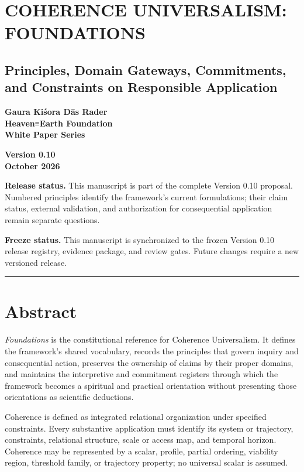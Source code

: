 \documentclass[
  11pt,
]{article}
\author{}
\date{}
\begin{document}
\section{COHERENCE UNIVERSALISM:
FOUNDATIONS}\label{coherence-universalism-foundations}

\subsection{Principles, Domain Gateways, Commitments, and Constraints on
Responsible
Application}\label{principles-domain-gateways-commitments-and-constraints-on-responsible-application}

\textbf{Gaura Kiśora Dās Rader}\\
\textbf{Heaven≡Earth Foundation}\\
\textbf{White Paper Series}

\textbf{Version 0.10}\\
\textbf{October 2026}

\textbf{Release status.} This manuscript is part of the complete Version
0.10 proposal. Numbered principles identify the framework's current
formulations; their claim status, external validation, and authorization
for consequential application remain separate questions.

\textbf{Freeze status.} This manuscript is synchronized to the frozen
Version 0.10 release registry, evidence package, and review gates.
Future changes require a new versioned release.

\begin{center}\rule{0.5\linewidth}{0.5pt}\end{center}

\section{Abstract}\label{abstract}

\emph{Foundations} is the constitutional reference for Coherence
Universalism. It defines the framework's shared vocabulary, records the
principles that govern inquiry and consequential action, preserves the
ownership of claims by their proper domains, and maintains the
interpretive and commitment registers through which the framework
becomes a spiritual and practical orientation without presenting those
orientations as scientific deductions.

Coherence is defined as integrated relational organization under
specified constraints. Every substantive application must identify its
system or trajectory, constraints, relational structure, scale or access
map, and temporal horizon. Coherence may be represented by a scalar,
profile, partial ordering, viability region, threshold family, or
trajectory property; no universal scalar is assumed.
\end{document}
